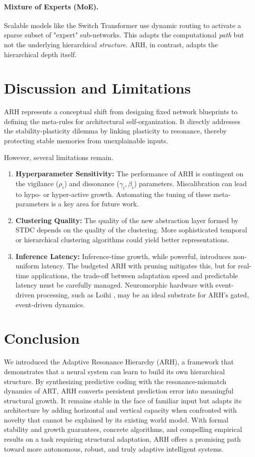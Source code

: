 \documentclass{article}
\begin{document}
\paragraph{Mixture of Experts (MoE).} Scalable models like the Switch Transformer \citep{switch2021} use dynamic routing to activate a sparse subset of "expert" sub-networks. This adapts the computational \emph{path} but not the underlying hierarchical \emph{structure}. ARH, in contrast, adapts the hierarchical depth itself.

\section{Discussion and Limitations}
ARH represents a conceptual shift from designing fixed network blueprints to defining the meta-rules for architectural self-organization. It directly addresses the stability-plasticity dilemma by linking plasticity to resonance, thereby protecting stable memories from unexplainable inputs.

However, several limitations remain.
\begin{enumerate}
    \item \textbf{Hyperparameter Sensitivity:} The performance of ARH is contingent on the vigilance ($\rho_i$) and dissonance ($\gamma_i, \beta_i$) parameters. Miscalibration can lead to hypo- or hyper-active growth. Automating the tuning of these meta-parameters is a key area for future work.
    \item \textbf{Clustering Quality:} The quality of the new abstraction layer formed by STDC depends on the quality of the clustering. More sophisticated temporal or hierarchical clustering algorithms could yield better representations.
    \item \textbf{Inference Latency:} Inference-time growth, while powerful, introduces non-uniform latency. The budgeted ARH with pruning mitigates this, but for real-time applications, the trade-off between adaptation speed and predictable latency must be carefully managed. Neuromorphic hardware with event-driven processing, such as Loihi \citep{loihi2018}, may be an ideal substrate for ARH's gated, event-driven dynamics.
\end{enumerate}

\section{Conclusion}
We introduced the Adaptive Resonance Hierarchy (ARH), a framework that demonstrates that a neural system can learn to build its own hierarchical structure. By synthesizing predictive coding with the resonance-mismatch dynamics of ART, ARH converts persistent prediction error into meaningful structural growth. It remains stable in the face of familiar input but adapts its architecture by adding horizontal and vertical capacity when confronted with novelty that cannot be explained by its existing world model. With formal stability and growth guarantees, concrete algorithms, and compelling empirical results on a task requiring structural adaptation, ARH offers a promising path toward more autonomous, robust, and truly adaptive intelligent systems.
\end{document}
